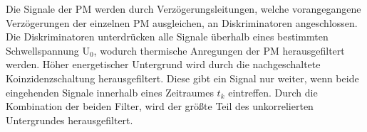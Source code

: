 Die Signale der PM werden durch Verzögerungsleitungen, welche vorangegangene Verzögerungen der einzelnen PM ausgleichen, an Diskriminatoren angeschlossen.
Die Diskriminatoren unterdrücken alle Signale überhalb eines bestimmten Schwellspannung U$_0$, wodurch thermische Anregungen der PM herausgefiltert werden.
Höher energetischer Untergrund wird durch die nachgeschaltete Koinzidenzschaltung herausgefiltert.
Diese gibt ein Signal nur weiter, wenn beide eingehenden Signale innerhalb eines Zeitraumes $t_k$ eintreffen.
Durch die Kombination der beiden Filter, wird der größte Teil des unkorrelierten Untergrundes herausgefiltert.

